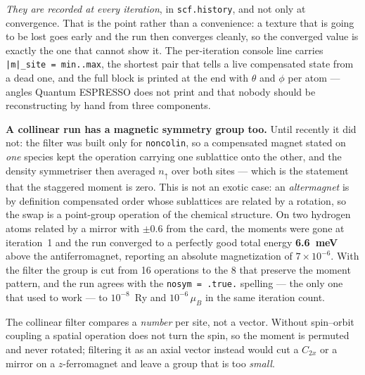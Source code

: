 \documentclass[11pt,a4paper]{article}
\newcommand{\qe}{Quantum ESPRESSO}
\newcommand{\code}[1]{\texttt{\small #1}}
\begin{document}
\emph{They are recorded at every iteration}, in \code{scf.history}, and not only
at convergence. That is the point rather than a convenience: a texture that is
going to be lost goes early and the run then converges cleanly, so the converged
value is exactly the one that cannot show it. The per-iteration console line
carries \code{|m|\_site = min..max}, the shortest pair that tells a live
compensated state from a dead one, and the full block is printed at the end with
$\theta$ and $\phi$ per atom --- angles \qe{} does not print and that nobody
should be reconstructing by hand from three components.

\textbf{A collinear run has a magnetic symmetry group too.} Until recently it did
not: the filter was built only for \code{noncolin}, so a compensated magnet
stated on \emph{one} species kept the operation carrying one sublattice onto the
other, and the density symmetriser then averaged $n_\uparrow$ over both sites ---
which is the statement that the staggered moment is zero. This is not an exotic
case: an \emph{altermagnet} is by definition compensated order whose sublattices
are related by a rotation, so the swap is a point-group operation of the chemical
structure. On two hydrogen atoms related by a mirror with $\pm0.6$ from the card,
the moments were gone at iteration~1 and the run converged to a perfectly good
total energy \textbf{6.6~meV} above the antiferromagnet, reporting an absolute
magnetization of $7\times10^{-6}$. With the filter the group is cut from 16
operations to the 8 that preserve the moment pattern, and the run agrees with the
\code{nosym = .true.} spelling --- the only one that used to work --- to
$10^{-8}$~Ry and $10^{-6}\,\mu_B$ in the same iteration count.

The collinear filter compares a \emph{number} per site, not a vector. Without
spin--orbit coupling a spatial operation does not turn the spin, so the moment is
permuted and never rotated; filtering it as an axial vector instead would cut a
$C_{2x}$ or a mirror on a $z$-ferromagnet and leave a group that is too
\emph{small}.
\end{document}

